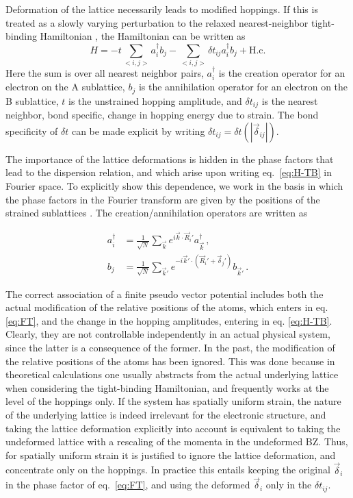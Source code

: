 Deformation of the lattice necessarily leads to modified hoppings. If this is treated as a slowly varying perturbation to the relaxed nearest-neighbor tight-binding Hamiltonian \cite{CastroNeto2009}, the Hamiltonian can be written as
\begin{equation}
  H = - t \sum_{<i,j>}a_i^{\dagger}b_j
    - \sum_{<i,j>} \delta t_{ij} a_i^{\dagger}b_j
    + \text{H.c.}
  \label{eq:H-TB}
\end{equation}
Here the sum is over all nearest neighbor pairs, $a_i^{\dagger}$ is the creation operator for an electron on the A sublattice, $b_j$ is the annihilation operator for an electron on the B sublattice, $t$ is the unstrained hopping amplitude, and $\delta t_{ij}$ is the nearest neighbor, bond specific, change in hopping energy due to strain. The bond specificity of $\delta t$ can be made explicit by writing $\delta t_{ij} = \delta t(|\vec{\delta}_{ij}|)$.

The importance of the lattice deformations is hidden in the phase factors that lead to the dispersion relation, and which arise upon writing eq.~\eqref{eq:H-TB} in Fourier space.
To explicitly show this dependence, we work in the basis in which the phase factors in the Fourier transform are given by the positions of the strained sublattices \cite{Bena2009}.
The creation/annihilation operators are written as

\begin{subequations}\label{eq:FT}
\begin{align}
a_i^{\dagger}&=\frac{1}{\sqrt{N}}\sum_{\vec{k}}e^{i \vec{k}\cdot\vec{R}_i'}a_{\vec{k}}^{\dagger}\,, \\ 
b_j&=\frac{1}{\sqrt{N}}\sum_{\vec{k}'}e^{-i \vec{k}'\cdot(\vec{R}_i'+\vec{\delta}_j')}b_{\vec{k}'}\,.
\end{align}
\end{subequations}

The correct association of a finite pseudo vector potential includes both the actual modification of the relative positions of the atoms, which enters in eq. \eqref{eq:FT}, and the change in the hopping amplitudes, entering in eq. \eqref{eq:H-TB}.
Clearly, they are not controllable independently in an actual physical system, since the latter is a consequence of the former.
In the past, the modification of the relative positions of the atoms has been ignored.
This was done because in theoretical calculations one usually abstracts from the actual underlying lattice when considering the tight-binding Hamiltonian, and frequently works at the level of the hoppings only.
If the system has spatially uniform strain, the nature of the underlying lattice is indeed irrelevant for the electronic structure, and taking the lattice deformation explicitly into account is equivalent to taking the undeformed lattice with a rescaling of the momenta in the undeformed BZ.
Thus, for spatially uniform strain it is justified to ignore the lattice deformation, and concentrate only on the hoppings.
In practice this entails keeping the original $\vec{\delta}_i$ in the phase factor of eq.~\eqref{eq:FT}, and using the deformed $\vec{\delta}_i$ only in the $\delta t_{ij}$.

